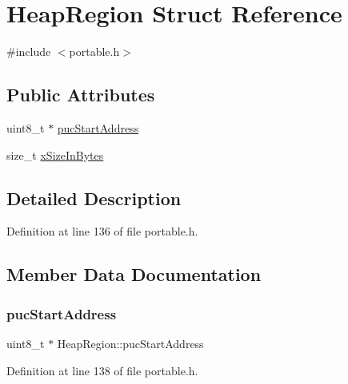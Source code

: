 \hypertarget{struct_heap_region}{}\section{Heap\+Region Struct Reference}
\label{struct_heap_region}


{\ttfamily \#include $<$portable.\+h$>$}

\subsection*{Public Attributes}
\begin{DoxyCompactItemize}
\item 
uint8\+\_\+t $\ast$ \hyperlink{struct_heap_region_a3bd58d728e35637101f37a00628076c4}{puc\+Start\+Address}
\item 
size\+\_\+t \hyperlink{struct_heap_region_a5933b0fd422e70a92ceef839b89a757f}{x\+Size\+In\+Bytes}
\end{DoxyCompactItemize}


\subsection{Detailed Description}


Definition at line 136 of file portable.\+h.



\subsection{Member Data Documentation}
\mbox{\label{struct_heap_region_a3bd58d728e35637101f37a00628076c4}} 
\subsubsection{\texorpdfstring{puc\+Start\+Address}{pucStartAddress}}
{\footnotesize\ttfamily uint8\+\_\+t $\ast$ Heap\+Region\+::puc\+Start\+Address}



Definition at line 138 of file portable.\+h.

\mbox{\label{struct_heap_region_a5933b0fd422e70a92ceef839b89a757f}} 

